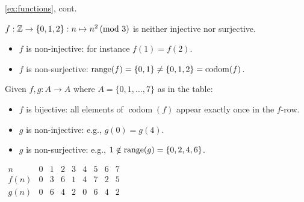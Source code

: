 \begin{examples*}{\ref{ex:functions}, cont.}{}
\begin{enumerate}




  	\item $f:\mathbb{Z}\to\{0,1,2\}:n\mapsto n^2\negthickspace\pmod{3}$ is neither injective nor surjective.
  	\begin{itemize}
  		\item $f$ is non-injective: for instance $f(1)=f(2)$.
  		\item $f$ is non-surjective: $\operatorname{range}(f)=\{0,1\}\neq \{0,1,2\}=\operatorname{codom}(f)$.
		\end{itemize}
	
		\begin{minipage}[t]{0.64\linewidth}\vspace{-10pt}
    	\item Given $f,g:A\to A$ where $A=\{0,1,\ldots,7\}$ as in the table:
    	\begin{itemize}\itemsep0pt
      	\item $f$ is bijective: all elements of $\operatorname{codom}(f)$ appear exactly once in the $f$-row.
     	 	\item $g$ is non-injective: e.g., $g(0)=g(4)$.
      	\item $g$ is non-surjective: e.g., $1\notin\operatorname{range}(g)=\{0,2,4,6\}$.
    	\end{itemize}
  	\end{minipage}
  	\hfill
  	\begin{minipage}[t]{0.35\linewidth}\vspace{-10pt}
  		\flushright
  		$\begin{array}{c|cccccccccc}
  			n&0&1&2&3&4&5&6&7\\\hline
  			f(n)&0&3&6&1&4&7&2&5\\\hline
  			g(n)&0&6&4&2&0&6&4&2
  		\end{array}$	
  	\end{minipage}


\end{enumerate}
\end{examples*}
